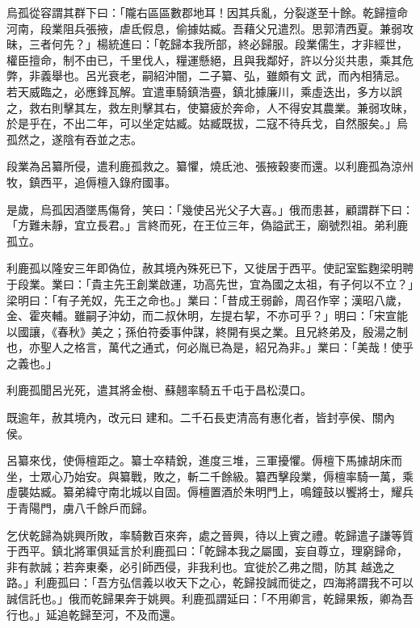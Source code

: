 \begin{pinyinscope}
 烏孤從容謂其群下曰：「隴右區區數郡地耳！因其兵亂，分裂遂至十餘。乾歸擅命河南，段業阻兵張掖，虐氐假息，偷據姑臧。吾藉父兄遣烈。思郭清西夏。兼弱攻昧，三者何先？」楊統進曰：「乾歸本我所部，終必歸服。段業儒生，才非經世，權臣擅命，制不由已，千里伐人，糧運懸絕，且與我鄰好，許以分災共患，乘其危弊，非義舉也。呂光衰老，嗣紹沖闇，二子纂、弘，雖頗有文
 武，而內相猜忌。若天威臨之，必應鋒瓦解。宜遣車騎鎮浩亹，鎮北據廉川，乘虛迭出，多方以誤之，救右則擊其左，救左則擊其右，使纂疲於奔命，人不得安其農業。兼弱攻昧，於是乎在，不出二年，可以坐定姑臧。姑臧既拔，二寇不待兵戈，自然服矣。」烏孤然之，遂陰有吞並之志。



 段業為呂纂所侵，遣利鹿孤救之。纂懼，燒氐池、張掖穀麥而還。以利鹿孤為涼州牧，鎮西平，追傉檀入錄府國事。



 是歲，烏孤因酒墜馬傷脅，笑曰：「幾使呂光父子大喜。」俄而患甚，顧謂群下曰：「方難未靜，宜立長君。」言終而死，在王位三年，偽謚武王，廟號烈祖。弟利鹿孤立。



 利鹿孤以隆安三年即偽位，赦其境內殊死已下，又徙居于西平。使記室監麴梁明聘于段業。業曰：「貴主先王創業啟運，功高先世，宜為國之太祖，有子何以不立？」梁明曰：「有子羌奴，先王之命也。」業曰：「昔成王弱齡，周召作宰；漢昭八歲，金、霍夾輔。雖嗣子沖幼，而二叔休明，左提右挈，不亦可乎？」明曰：「宋宣能以國讓，《春秋》美之；孫伯符委事仲謀，終開有吳之業。且兄終弟及，殷湯之制也，亦聖人之格言，萬代之通式，何必胤已為是，紹兄為非。」業曰：「美哉！使乎之義也。」



 利鹿孤聞呂光死，遣其將金樹、蘇翹率騎五千屯于昌松漠口。



 既逾年，赦其境內，改元曰
 建和。二千石長吏清高有惠化者，皆封亭侯、關內侯。



 呂纂來伐，使傉檀距之。纂士卒精銳，進度三堆，三軍擾懼。傉檀下馬據胡床而坐，士眾心乃始安。與纂戰，敗之，斬二千餘級。纂西擊段業，傉檀率騎一萬，乘虛襲姑臧。纂弟緯守南北城以自固。傉檀置酒於朱明門上，鳴鐘鼓以饗將士，耀兵于青陽門，虜八千餘戶而歸。



 乞伏乾歸為姚興所敗，率騎數百來奔，處之晉興，待以上賓之禮。乾歸遣子謙等質于西平。鎮北將軍俱延言於利鹿孤曰：「乾歸本我之屬國，妄自尊立，理窮歸命，非有款誠；若奔東秦，必引師西侵，非我利也。宜徙於乙弗之間，防其
 越逸之路。」利鹿孤曰：「吾方弘信義以收天下之心，乾歸投誠而徙之，四海將謂我不可以誠信託也。」俄而乾歸果奔于姚興。利鹿孤謂延曰：「不用卿言，乾歸果叛，卿為吾行也。」延追乾歸至河，不及而還。




\end{pinyinscope}
